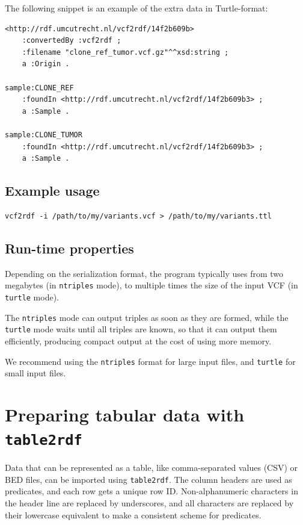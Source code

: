 \documentclass[11pt,a4paper,oneside]{book}
\begin{document}
  The following snippet is an example of the extra data in Turtle-format:

\begin{siderules}
\begin{verbatim}
<http://rdf.umcutrecht.nl/vcf2rdf/14f2b609b>
    :convertedBy :vcf2rdf ;
    :filename "clone_ref_tumor.vcf.gz"^^xsd:string ;
    a :Origin .

sample:CLONE_REF
    :foundIn <http://rdf.umcutrecht.nl/vcf2rdf/14f2b609b3> ;
    a :Sample .

sample:CLONE_TUMOR
    :foundIn <http://rdf.umcutrecht.nl/vcf2rdf/14f2b609b3> ;
    a :Sample .
\end{verbatim}
\end{siderules}

\subsection{Example usage}

\begin{siderules}
\begin{verbatim}
vcf2rdf -i /path/to/my/variants.vcf > /path/to/my/variants.ttl
\end{verbatim}
\end{siderules}

\subsection{Run-time properties}

  Depending on the serialization format, the program typically uses from two megabytes
  (in \texttt{ntriples} mode), to multiple times the size of the input VCF
  (in \texttt{turtle} mode).

  The \texttt{ntriples} mode can output triples as soon as they are formed, while the
  \texttt{turtle} mode waits until all triples are known, so that it can output them
  efficiently, producing compact output at the cost of using more memory.

  We recommend using the \texttt{ntriples} format for large input files, and
  \texttt{turtle} for small input files.

\section{Preparing tabular data with \texttt{table2rdf}}
\label{sec:table2rdf}

  Data that can be represented as a table, like comma-separated values (CSV)
  or BED files, can be imported using \texttt{table2rdf}.  The column headers
  are used as predicates, and each row gets a unique row ID.  Non-alphanumeric
  characters in the header line are replaced by underscores, and all characters
  are replaced by their lowercase equivalent to make a consistent scheme for
  predicates.
\end{document}
